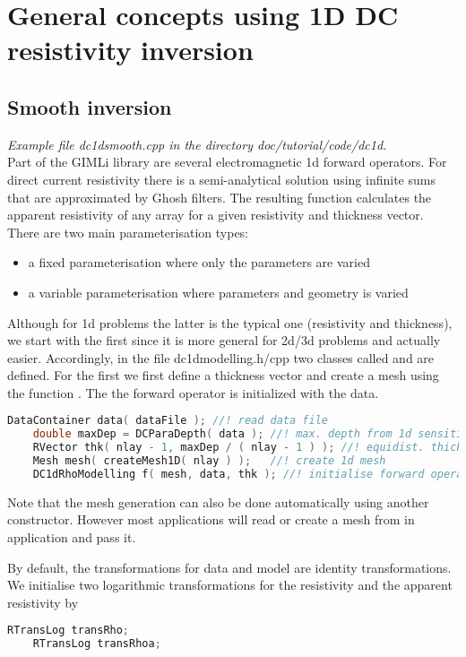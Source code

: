 \section{General concepts using 1D DC resistivity inversion}\label{sec:dc1d}
\subsection{Smooth inversion}\label{sec:dc1dsmooth}
{\em Example file dc1dsmooth.cpp in the directory doc/tutorial/code/dc1d.}\\
Part of the GIMLi library are several electromagnetic 1d forward operators.
For direct current resistivity there is a semi-analytical solution using infinite sums that are approximated by Ghosh filters. 
The resulting function calculates the apparent resistivity of any array for a given resistivity and thickness vector.
There are two main parameterisation types:
\begin{itemize}
	\item a fixed parameterisation where only the parameters are varied 
	\item a variable parameterisation where parameters and geometry is varied
\end{itemize}

Although for 1d problems the latter is the typical one (resistivity and thickness), we start with the first since it is more general for 2d/3d problems and actually easier.
Accordingly, in the file dc1dmodelling.h/cpp two classes called  and  are defined.
For the first we first define a thickness vector and create a mesh using the function .
The the forward operator is initialized with the data.

\begin{lstlisting}[language=C++]
    DataContainer data( dataFile ); //! read data file    
    double maxDep = DCParaDepth( data ); //! max. depth from 1d sensitivity
    RVector thk( nlay - 1, maxDep / ( nlay - 1 ) ); //! equidist. thickness
    Mesh mesh( createMesh1D( nlay ) );   //! create 1d mesh
    DC1dRhoModelling f( mesh, data, thk ); //! initialise forward operator
\end{lstlisting}

Note that the mesh generation can also be done automatically using another constructor.
However most applications will read or create a mesh from in application and pass it.

By default, the transformations for data and model are identity transformations.
We initialise two logarithmic transformations for the resistivity and the apparent resistivity by 
\begin{lstlisting}[language=C++]
    RTransLog transRho;
    RTransLog transRhoa;
\end{lstlisting}

